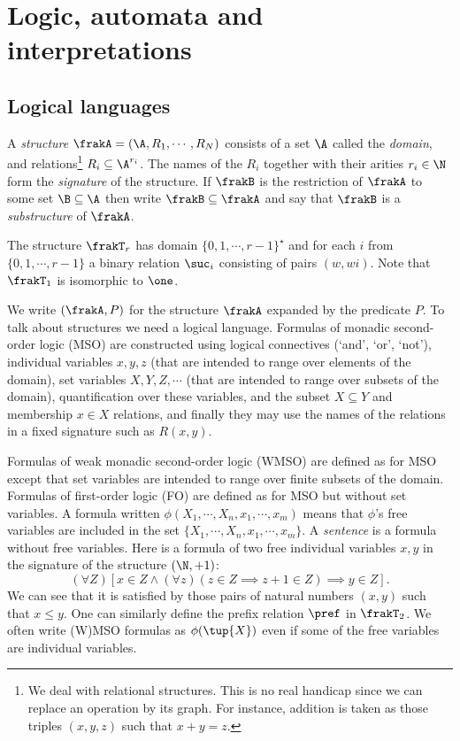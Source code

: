\section{Logic, automata and interpretations} \label{AS:sec:back}


 
\subsection{Logical languages}

A \emph{structure}  $\frakA = (\A, R_1, \cdots, R_N)$ consists of a set $\A$ called the {\em domain}, and relations\footnote{We deal with relational structures. This is no real handicap since we can replace an operation by its graph. For instance, addition is taken as those triples $(x,y,z)$ such that $x+y = z$.} $R_i \subseteq \A^{r_i}$. The names of the $R_i$ together with their arities $r_i \in \N$ form the \emph{signature} of the structure. If $\frakB$ is the restriction of $\frakA$ to some set $\B \subseteq \A$ then write $\frakB \subseteq \frakA$ and say that $\frakB$ is a \emph{substructure} of $\frakA$.

\begin{example}
The structure  $\frakT_r$ has domain $\{0,1, \cdots,r-1\}^\star$ and for each  $i$ from $\{0,1, \cdots, r-1\}$ a binary relation $\suc_i$ consisting of pairs $(w,wi)$. 
Note that $\frakT_1$ is isomorphic to $\one$.
\end{example}

We write $(\frakA,P)$ for the structure $\frakA$ expanded by the predicate $P$. 
To talk about structures we need a logical language. Formulas of monadic
second-order logic (MSO) are constructed using logical connectives (`and',
`or', `not'), individual variables $x,y,z$ (that are intended to range over
elements of the domain), set variables $X,Y,Z,\cdots$ (that are intended to
range over subsets of the domain), quantification over these variables, and the
subset $X \subseteq Y$ and membership $x \in X$ relations, and finally they may
use the names of the relations in a fixed signature such as $R(x,y)$.

Formulas of weak monadic second-order logic (WMSO) are defined as for MSO
except that set variables are intended to range over finite subsets of the
domain. Formulas of first-order logic (FO) are defined as for MSO but without 
set variables. A formula written $\phi(X_1,\cdots,X_n,x_1,\cdots,x_m)$ means that $\phi$'s
free variables are included in the set $\{X_1,\cdots,X_n,x_1,\cdots,x_m\}$.
A {\em sentence} is a formula without free variables. 
Here is a formula of two free individual variables $x,y$ in the signature of the structure $(\N,+1)$:
\[
(\forall Z) [x \in Z \wedge (\forall z)(z \in Z \implies z+1 \in Z) \implies y \in Z].
\]
We can see that it is satisfied by those pairs of natural numbers $(x,y)$ such that $x \leq y$. 
One can similarly define the prefix relation $\pref$ in $\frakT_2$. We often write (W)MSO formulas as $\phi(\tup{X})$ even if some of the free
variables are individual variables.

